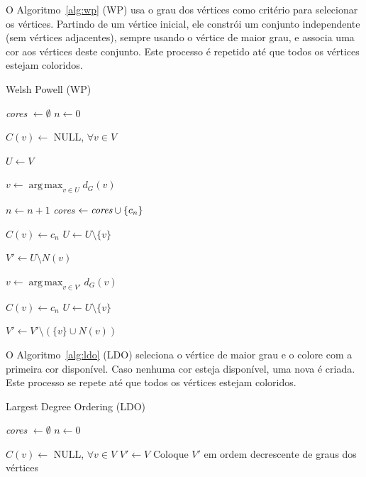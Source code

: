 \documentclass[10pt, twocolumn]{article}
\DeclareMathOperator*{\argmax}{arg\,max}
\begin{document}
O Algoritmo~\ref{alg:wp} (WP) usa o grau dos vértices como critério para
selecionar os vértices. Partindo de um vértice inicial, ele constrói um conjunto
independente (sem vértices adjacentes), sempre usando o vértice de maior grau,
e associa uma cor aos vértices deste conjunto. Este processo é repetido até que
todos os vértices estejam coloridos.

\begin{algorithm}
\caption{Welsh Powell (WP)}
\label{alg:wp}


\emph{cores} $\gets \emptyset$\;
$n \gets 0$\;

$C(v) \gets$ NULL, $\forall v \in V$\;

$U \gets V$\;

 {
    $v \gets \argmax_{v \in U} d_G(v)$\;

    $n \gets n + 1$\;
    \emph{cores} $\gets \emph{cores} \cup \{c_n\}$\;

    $C(v) \gets c_n$\;
    $U \gets U \setminus \{v\}$\;

    $V' \gets U \setminus N(v)$\;

     {
        $v \gets \argmax_{v \in V'} d_G(v)$\;
        
        $C(v) \gets c_n$\;
        $U \gets U \setminus \{v\}$\;

        $V' \gets V' \setminus (\{v\} \cup N(v))$\;
    }
}

\;

\end{algorithm}


O Algoritmo~\ref{alg:ldo} (LDO) seleciona o vértice de maior grau
e o colore com a primeira cor disponível. Caso nenhuma cor esteja disponível,
uma nova é criada. Este processo se repete até que todos os vértices estejam coloridos.


\begin{algorithm}
\caption{Largest Degree Ordering (LDO)}
\label{alg:ldo}


\emph{cores} $\gets \emptyset$\;
$n \gets 0$\;

$C(v) \gets$ NULL, $\forall v \in V$\;
$V' \gets V$\;
Coloque $V'$ em ordem decrescente de graus dos vértices\;

 {
     {
    }
}
\;

\end{algorithm}
\end{document}

